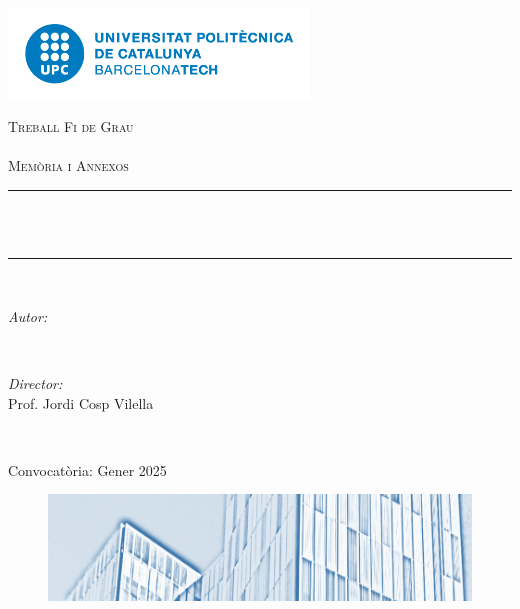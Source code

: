 
\begin{titlepage}


\newcommand{\HRule}{\rule{\linewidth}{0.5mm}} %

\centering
\includegraphics[width=8cm]{upc-positiu-p3005.png}\\[1cm] 
 
\center 

\textsc{\LARGE Treball Fi de Grau}\\[1.5cm] 
\textsc{\large \grau}\\[0.5cm] 
\textsc{\Large Memòria i Annexos}\\[0.5cm] 

\makeatletter
\HRule \\[0.4cm]
{ \huge \bfseries \titol}\\[0.4cm] %
\HRule \\[1.5cm]
 

\begin{minipage}{0.4\textwidth}
\begin{flushleft} \large
\emph{Autor:}\\
\autortesi 


\end{flushleft}
\end{minipage}
~
\begin{minipage}{0.4\textwidth}
\begin{flushright} \large
\emph{Director:} \\
Prof. Jordi Cosp Vilella \\[1.2em] 
\end{flushright}
\end{minipage}\\[2cm]
\makeatother


{\large Convocatòria: Gener 2025}\\[2cm]

\begin{figure}[H]
\centering
  \includegraphics[width=15cm]{logo_eebe_portada.png}
\end{figure}
\end{titlepage}

\vfill %